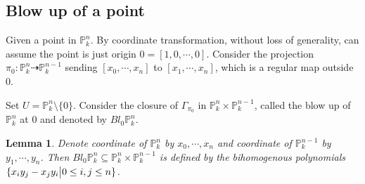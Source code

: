 \documentclass{ctexart}
\newtheorem{lemma}{Lemma}[section]
\begin{document}
\subsection{Blow up of a point}
\label{subsection:Blow_Up_Blow_up_of_a_point}

Given a point in $\mathbb{P}_{k}^{n}$.
By coordinate transformation, without loss of generality, can assume the point is just origin $0 = [1, 0, \cdots, 0]$.
Consider the projection $\pi_{0}: \mathbb{P}_{k}^{n} \dashrightarrow \mathbb{P}_{k}^{n - 1}$ sending $[x_{0}, \cdots, x_{n}]$ to $[x_{1}, \cdots, x_{n}]$,
which is a regular map outside $0$.
\par
Set $U = \mathbb{P}_{k}^{n} \setminus \{0\}$.
Consider the closure of $\Gamma_{\pi_{0}}$ in $\mathbb{P}_{k}^{n} \times \mathbb{P}_{k}^{n - 1}$, called the blow up of $\mathbb{P}_{k}^{n}$ at $0$ and denoted by $Bl_{0}\mathbb{P}_{k}^{n}$.
\begin{lemma}
    Denote coordinate of $\mathbb{P}_{k}^{n}$ by $x_{0}, \cdots, x_{n}$ and coordinate of $\mathbb{P}_{k}^{n - 1}$ by $y_{1}, \cdots, y_{n}$.
    Then $Bl_{0}\mathbb{P}_{k}^{n} \subseteq \mathbb{P}_{k}^{n} \times \mathbb{P}_{k}^{n - 1}$ is defined by the bihomogenous polynomials $\{x_{i}y_{j} - x_{j}y_{i} \big{|} 0 \le i,j \le n\}$.
    \label{Lemma 3.2}
\end{lemma}
\end{document}
